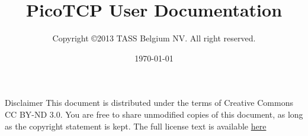 %






\usepackage{longtable}


\usepackage[compact]{titlesec}

\usepackage{enumitem}

\usepackage{hyperref}
\setcounter{tocdepth}{1}




\title{PicoTCP User Documentation}
\author{Copyright \copyright 2013 TASS Belgium NV. All right reserved.}
\maketitle
\date{\today}
\maketitle

\thispagestyle{empty}

Disclaimer
This document is distributed under the terms of Creative Commons CC BY-ND 3.0.
You are free to share unmodified copies of this document, as long as the copyright
statement is kept. The full license text is available 
\href{http://creativecommons.org/licenses/by-nd/3.0/} {here}


